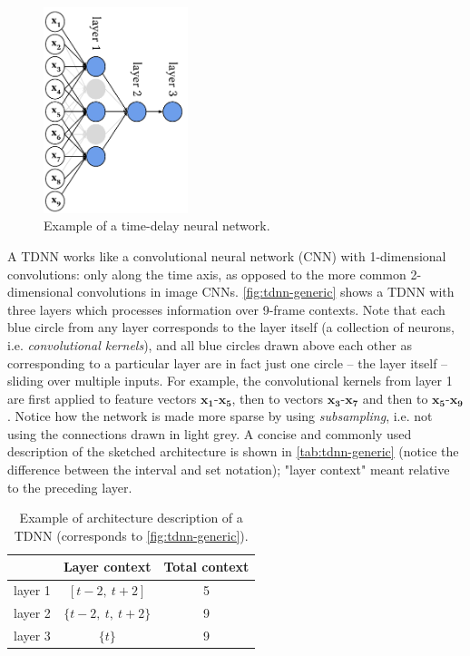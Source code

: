\documentclass[bsc,frontabs,twoside,singlespacing,parskip,deptreport]{infthesis}
\begin{document}
{{    %
    \begin{figure}[h!]
      \centering
      \includegraphics[height=6cm]{graphics/tdnn-generic}
      \caption{Example of a time-delay neural network.}
      \label{fig:tdnn-generic}
    \end{figure}
    A TDNN works like a convolutional neural network (CNN) with 1-dimensional convolutions: only along the time axis, as opposed to the more common 2-dimensional convolutions in image CNNs. \autoref{fig:tdnn-generic} shows a TDNN with three layers which processes information over 9-frame contexts. Note that each blue circle from any layer corresponds to the layer itself (a collection of neurons, i.e. \textit{convolutional kernels}), and all blue circles drawn above each other as corresponding to a particular layer are in fact just one circle -- the layer itself -- sliding over multiple inputs. For example, the convolutional kernels from layer 1 are first applied to feature vectors $\mathbf{x_1}$-$\mathbf{x_5}$, then to vectors $\mathbf{x_3}$-$\mathbf{x_7}$ and then to $\mathbf{x_5}$-$\mathbf{x_9}$. Notice how the network is made more sparse by using \textit{subsampling}, i.e. not using the connections drawn in light grey. A concise and commonly used description of the sketched architecture is shown in \autoref{tab:tdnn-generic} (notice the difference between the interval and set notation); "layer context" meant relative to the preceding layer.
    \begin{table}[h!tb]
      \centering
      \begin{sc}
        \begin{tabular}{l|cc}
                      & Layer context      & Total context \\
          \hline
          layer 1     & $[t-2,\ t+2]$      & 5 \\
          layer 2     & $\{t-2,\ t,\ t+2\}$& 9 \\
          layer 3     & $\{t\}$            & 9 \\
        \end{tabular}
      \end{sc}
      \caption{Example of architecture description of a TDNN (corresponds to \autoref{fig:tdnn-generic}).}
      \label{tab:tdnn-generic}
    \end{table}

}}
\end{document}

